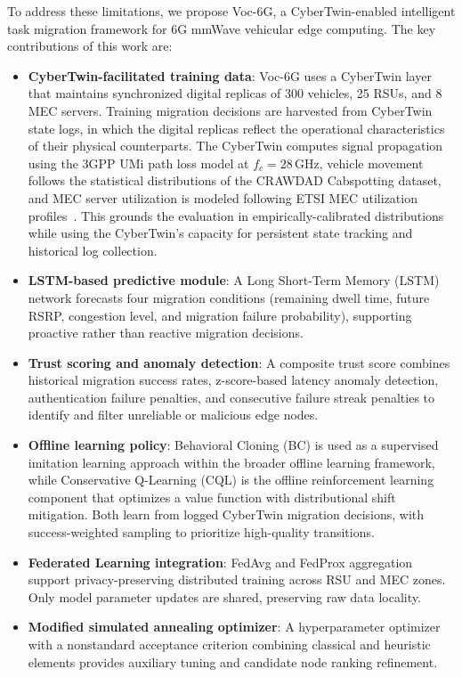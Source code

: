 \documentclass[10pt,letterpaper]{article}
\providecommand{\VocSixG}{Voc-6G}
\begin{document}
To address these limitations, we propose \VocSixG{}, a CyberTwin-enabled intelligent task migration framework for 6G mmWave vehicular edge computing. The key contributions of this work are:

\begin{itemize}
    \item \textbf{CyberTwin-facilitated training data}: \VocSixG{} uses a CyberTwin layer that maintains synchronized digital replicas of 300 vehicles, 25 RSUs, and 8 MEC servers. Training migration decisions are harvested from CyberTwin state logs, in which the digital replicas reflect the operational characteristics of their physical counterparts. The CyberTwin computes signal propagation using the 3GPP UMi path loss model at $f_c=28$\,GHz, vehicle movement follows the statistical distributions of the CRAWDAD Cabspotting dataset, and MEC server utilization is modeled following ETSI MEC utilization profiles~\cite{etsi_mec003}. This grounds the evaluation in empirically-calibrated distributions while using the CyberTwin's capacity for persistent state tracking and historical log collection.

    \item \textbf{LSTM-based predictive module}: A Long Short-Term Memory (LSTM) network forecasts four migration conditions (remaining dwell time, future RSRP, congestion level, and migration failure probability), supporting proactive rather than reactive migration decisions.

    \item \textbf{Trust scoring and anomaly detection}: A composite trust score combines historical migration success rates, z-score-based latency anomaly detection, authentication failure penalties, and consecutive failure streak penalties to identify and filter unreliable or malicious edge nodes.

    \item \textbf{Offline learning policy}: Behavioral Cloning (BC) is used as a supervised imitation learning approach within the broader offline learning framework, while Conservative Q-Learning (CQL) is the offline reinforcement learning component that optimizes a value function with distributional shift mitigation. Both learn from logged CyberTwin migration decisions, with success-weighted sampling to prioritize high-quality transitions.

    \item \textbf{Federated Learning integration}: FedAvg and FedProx aggregation support privacy-preserving distributed training across RSU and MEC zones. Only model parameter updates are shared, preserving raw data locality.

    \item \textbf{Modified simulated annealing optimizer}: A hyperparameter optimizer with a nonstandard acceptance criterion combining classical and heuristic elements provides auxiliary tuning and candidate node ranking refinement.
\end{itemize}
\end{document}
